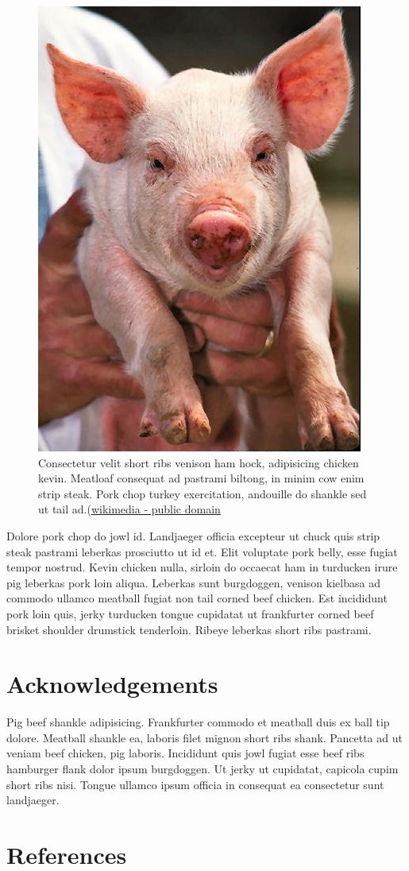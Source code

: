 \documentclass[paper]{ijdc-v9}
\begin{document}
\begin{figure}[htbp]
\centering
\includegraphics{Pig_USDA01c0116.jpg}
\caption{Consectetur velit short ribs venison ham hock, adipisicing
chicken kevin. Meatloaf consequat ad pastrami biltong, in minim cow enim
strip steak. Pork chop turkey exercitation, andouille do shankle sed ut
tail
ad.(\href{https://commons.wikimedia.org/wiki/File:Pig_USDA01c0116.jpg}{wikimedia
- public domain}}
\end{figure}

Dolore pork chop do jowl id. Landjaeger officia excepteur ut chuck quis
strip steak pastrami leberkas prosciutto ut id et. Elit voluptate pork
belly, esse fugiat tempor nostrud. Kevin chicken nulla, sirloin do
occaecat ham in turducken irure pig leberkas pork loin aliqua. Leberkas
sunt burgdoggen, venison kielbasa ad commodo ullamco meatball fugiat non
tail corned beef chicken. Est incididunt pork loin quis, jerky turducken
tongue cupidatat ut frankfurter corned beef brisket shoulder drumstick
tenderloin. Ribeye leberkas short ribs pastrami.

\section{Acknowledgements}\label{acknowledgements}

Pig beef shankle adipisicing. Frankfurter commodo et meatball duis ex
ball tip dolore. Meatball shankle ea, laboris filet mignon short ribs
shank. Pancetta ad ut veniam beef chicken, pig laboris. Incididunt quis
jowl fugiat esse beef ribs hamburger flank dolor ipsum burgdoggen. Ut
jerky ut cupidatat, capicola cupim short ribs nisi. Tongue ullamco ipsum
officia in consequat ea consectetur sunt landjaeger.

\section{References}\label{references}
\end{document}
